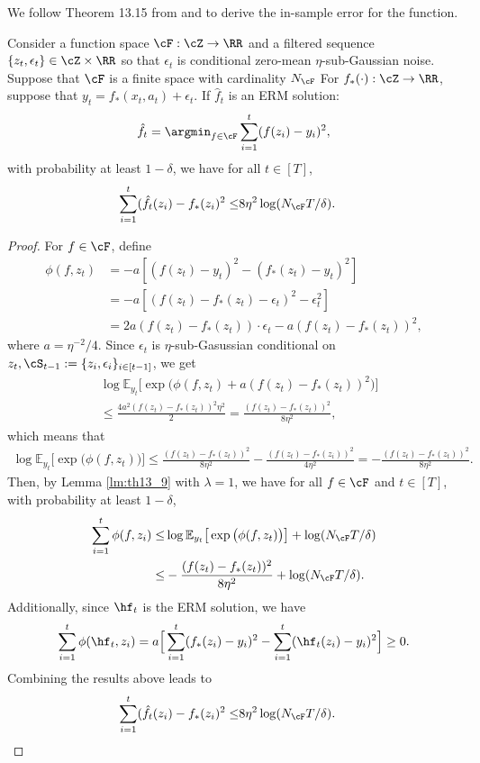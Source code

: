 \documentclass[11pt]{article}
\newcommand{\E}{\mathbb E}
\begin{document}
We follow Theorem 13.15 from \citet{zhang2023mathematical} and \citet{ye2023corruption} to derive the in-sample error for the function.
\begin{lemma}\label{lm:Generalization error of reward function}
    Consider a function space $\cF:\cZ\rightarrow\RR$ and a filtered sequence $\{z_t,\epsilon_t\}\in\cZ\times\RR$ so that $\epsilon_t$ is conditional zero-mean $\eta$-sub-Gaussian noise. Suppose that $\cF$ is a finite space with cardinality $N_{\cF}$ For $f_*(\cdot):\cZ\rightarrow\RR$, suppose that $y_t=f_*(x_t,a_t)+\epsilon_t$. If $\hat{f}_t$ is an ERM solution:
$$
\hat{f}_t = \argmin_{f\in\cF}\sum_{i=1}^t(f(z_i)-y_i)^2,
$$
with probability at least $1-\delta$, we have for all $t\in[T]$,
\begin{align*}
    \sum_{i=1}^t(\hat{f}_t(z_i)-f_*(z_i)^2 \le& 8\eta^2\log(N_{\cF}T/\delta) .
\end{align*}
\end{lemma}
\begin{proof}
For $f\in\cF$, define
\begin{align*}
    \phi(f,z_t)&= -a\left[ (f(z_t)-y_t)^2-(f_*(z_t)-y_t)^2\right]\\
    &= -a\left[ (f(z_t)-f_*(z_t)-\epsilon_t)^2-\epsilon_t^2\right]\\
    &= 2a(f(z_t)-f_*(z_t))\cdot\epsilon_t -a(f(z_t)-f_*(z_t))^2,
\end{align*}
where $a=\eta^{-2}/4$. Since $\epsilon_t$ is $\eta$-sub-Gasussian conditional on $z_t,\cS_{t-1}:=\{z_i,\epsilon_i\}_{i\in[t-1]}$, we get
\begin{align*}
    &\log\E_{y_t}\big[\exp\big(\phi(f,z_t)+a(f(z_t)-f_*(z_t))^2\big)\big]\\
    &\le \frac{4a^2(f(z_t)-f_*(z_t))^2\eta^2}{2} = \frac{(f(z_t)-f_*(z_t))^2}{8\eta^2},
\end{align*}
which means that
\begin{align*}
    \log\E_{y_t}\big[\exp\big(\phi(f,z_t)\big)\big] \le \frac{(f(z_t)-f_*(z_t))^2}{8\eta^2} - \frac{(f(z_t)-f_*(z_i))^2}{4\eta^2} = -\frac{(f(z_t)-f_*(z_t))^2}{8\eta^2}.
\end{align*}
Then, by Lemma \ref{lm:th13_9} with $\lambda=1$, we have for all $f\in\cF$ and $t\in[T]$, with probability at least $1-\delta$,
\begin{align*}
    \sum_{i=1}^t\phi(f,z_i) \le& \log\E_{y_t}\big[\exp\big(\phi(f,z_t)\big)\big]  + \log(N_{\cF}T/\delta)\\
    \le& -\frac{(f(z_t)-f_*(z_t))^2}{8\eta^2} + \log(N_{\cF}T/\delta).
\end{align*}
Additionally, since $\hf_t$ is the ERM solution, we have
\begin{align*}
    \sum_{i=1}^t\phi(\hf_t,z_i) = a\Big[\sum_{i=1}^t(f_*(z_i)-y_i)^2 - \sum_{i=1}^t(\hf_t(z_i)-y_i)^2\Big] \ge 0.
\end{align*}
Combining the results above leads to
\begin{align*}
    \sum_{i=1}^t(\hat{f}_t(z_i)-f_*(z_i)^2 \le& 8\eta^2\log(N_{\cF}T/\delta).
\end{align*}
\end{proof}
\end{document}
